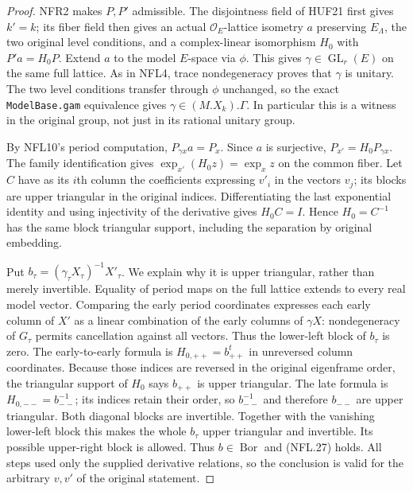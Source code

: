 \documentclass[11pt,a4paper]{article}
\numberwithin{equation}{section}
\theoremstyle{remark}\newtheorem{remark}[theorem]{Remark}
\begin{document}
\begin{proof}
NFR2 makes $P,P'$ admissible.  The disjointness field of HUF21
first gives $k'=k$; its fiber field then gives an actual
$\mathcal O_E$-lattice isometry $a$ preserving $E_\Lambda$,
the two original level conditions, and a complex-linear
isomorphism $H_0$ with $P'a=H_0P$.
Extend $a$ to the model $E$-space via $\phi$.  This gives
$\gamma\in\operatorname{GL}_r(E)$ on the same full lattice.
As in NFL4, trace nondegeneracy proves that $\gamma$ is unitary.
The two level conditions transfer through $\phi$ unchanged,
so the exact \texttt{Model\allowbreak Base.\allowbreak gam} equivalence gives
$\gamma\in(M.X_k).\Gamma$.  In particular this is a witness
in the original group, not just in its rational unitary group.

By NFL10's period computation, $P_{\gamma x}a=P_x$.
Since $a$ is surjective, $P_{x'}=H_0P_{\gamma x}$.
The family identification gives
$\exp_{x'}(H_0z)=\exp_xz$ on the common fiber.
Let $C$ have as its $i$th column the coefficients expressing
$v'_i$ in the vectors $v_j$; its blocks are upper triangular
in the original indices.  Differentiating the last exponential
identity and using injectivity of the derivative gives
$H_0C=I$.  Hence $H_0=C^{-1}$ has the same block triangular
support, including the separation by original embedding.

Put $b_\tau=(\gamma_\tau X_\tau)^{-1}X'_\tau$.
We explain why it is upper triangular, rather than merely
invertible.  Equality of period maps on the full lattice
extends to every real model vector.  Comparing the early
period coordinates expresses each early column of $X'$ as a
linear combination of the early columns of $\gamma X$:
nondegeneracy of $G_\tau$ permits cancellation against all
vectors.  Thus the lower-left block of $b_\tau$ is zero.
The early-to-early formula is $H_{0,++}=b_{++}^t$ in unreversed
column coordinates.  Because those indices are reversed in
the original eigenframe order, the triangular support of
$H_0$ says $b_{++}$ is upper triangular.  The late formula is
$H_{0,--}=b_{--}^{-1}$; its indices retain their order, so
$b_{--}^{-1}$ and therefore $b_{--}$ are upper triangular.
Both diagonal blocks are invertible.  Together with the
vanishing lower-left block this makes the whole $b_\tau$
upper triangular and invertible.  Its possible upper-right
block is allowed.  Thus $b\in\operatorname{Bor}$ and (NFL.27)
holds.  All steps used only the supplied derivative relations,
so the conclusion is valid for the arbitrary $v,v'$ of the
original statement.
\end{proof}
\end{document}
